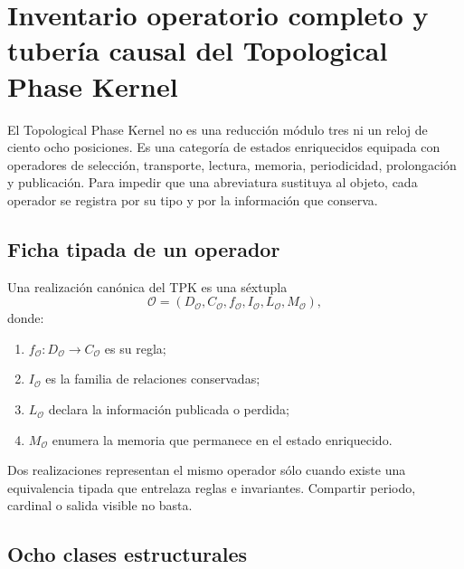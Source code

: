
\chapter{Inventario operatorio completo y tubería causal del Topological Phase Kernel}
\label{chap:inventario-operatorio-completo-tpk}

El Topological Phase Kernel no es una reducción módulo tres ni un reloj de
ciento ocho posiciones. Es una categoría de estados enriquecidos equipada
con operadores de selección, transporte, lectura, memoria, periodicidad,
prolongación y publicación. Para impedir que una abreviatura sustituya al
objeto, cada operador se registra por su tipo y por la información que
conserva.

\section{Ficha tipada de un operador}

\begin{definition}
\label{def:u006f-ficha-operatoria}
Una realización canónica del TPK es una séxtupla
\begin{equation}
 \mathcal O=
 (D_{\mathcal O},C_{\mathcal O},f_{\mathcal O},
 I_{\mathcal O},L_{\mathcal O},M_{\mathcal O}),
 \label{eq:u006f-ficha}
\end{equation}
donde:
\begin{enumerate}
 \item \(f_{\mathcal O}:D_{\mathcal O}\to C_{\mathcal O}\) es su regla;
 \item \(I_{\mathcal O}\) es la familia de relaciones conservadas;
 \item \(L_{\mathcal O}\) declara la información publicada o perdida;
 \item \(M_{\mathcal O}\) enumera la memoria que permanece en el estado
 enriquecido.
\end{enumerate}
\end{definition}

Dos realizaciones representan el mismo operador sólo cuando existe una
equivalencia tipada que entrelaza reglas e invariantes. Compartir periodo,
cardinal o salida visible no basta.

\section{Ocho clases estructurales}

